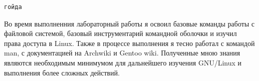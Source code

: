     \begin{lstlisting}[caption={Результат выполнения программы},label={lst:result}]
гойда
    \end{lstlisting}

    Во время выполненния лабораторный работы я освоил базовые команды работы с файловой системой, базовый инструментарий командной оболочки и изучил права доступа в Linux. Также в процессе выполнения я тесно работал с командой man, с документацией на Archwiki и Gentoo wiki. Полученные мною знания являются необходимым минимумом для дальнейшего изучения GNU/Linux и выполнения более сложных действий.
    \newpage






